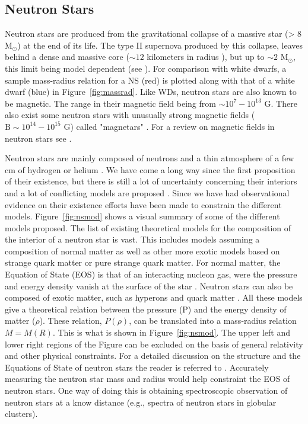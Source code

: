 \subsection{Neutron Stars}\label{sec:ns}

Neutron stars are produced from the gravitational collapse of a massive star (> 8 M$_\odot$)\citep{de2008stars} at the end of its life. The type II supernova produced by this collapse, leaves behind a dense and massive core ($\sim 12$ kilometers in radius \citealt{de2008stars}), but up to $\sim 2$ M$_\odot$, this limit being model dependent (see \citealt{lattimer_neutron_2007}). For comparison with white dwarfs, a sample mass-radius relation for a NS (red) is plotted along with that of a white dwarf (blue) in Figure~\ref{fig:massrad}. Like WDs, neutron stars are also known to be magnetic. The range in their magnetic field being from $\sim 10^7 - 10^{13}$ G. There also exist some neutron stars with unusually strong magnetic fields ($\text{B}\sim 10^{14} - 10^{15}\text{ G}$) called "magnetars" \citep{duncan_formation_1992}. For a review on magnetic fields in neutron stars see \cite{reisenegger_magnetic_2005}. 


Neutron stars are mainly composed of neutrons and a thin atmosphere of a few cm of hydrogen or helium \citep{zavlin_ns_1996}. We have come a long way since the first proposition of their existence, but there is still a lot of  uncertainty concerning their interiors and a lot of conflicting models are proposed \citep{lattimer_neutron_2007}. Since we have had observational evidence on their existence \citep{hewish_pulsar_1968} efforts have been made to constrain the different models. Figure~\ref{fig:nsmod} shows a visual summary of some of the different models proposed. The list of existing theoretical models for the  composition of the interior of a neutron star is vast. This includes models assuming a composition of normal matter as well as other more exotic models based on strange quark matter or pure strange quark matter. For normal matter, the Equation of State (EOS) is that of an interacting nucleon gas, were the pressure and energy density vanish at the surface of the star \citep{lattimereos2001}. Neutron stars can also be composed of exotic matter, such as hyperons and quark matter \citep{cleymans_physics_1999}. All these models give a theoretical relation between the pressure (P) and the energy density of matter ($\rho$). These relation, $P(\rho)$, can be translated into a mass-radius relation $M=M(R)$. This is what is shown in Figure~\ref{fig:nsmod}. The upper left and lower right regions of the Figure can be excluded on the basis of general relativity and other physical constraints. For a detailed discussion on the structure and the Equations of State of neutron stars the reader is referred to \cite{lattimereos2001}. Accurately measuring the neutron star mass and radius would help constraint the EOS of neutron stars. One way of doing this is obtaining spectroscopic observation of neutron stars at a know distance (e.g., spectra of neutron stars in globular clusters).  

